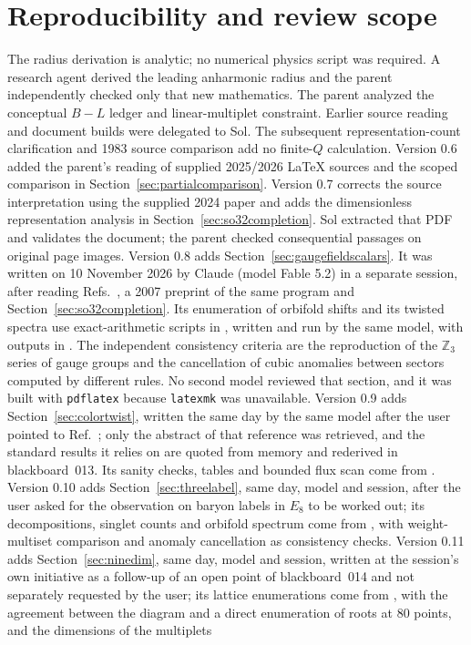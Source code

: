 \documentclass[11pt]{article}
\begin{document}









\section*{Reproducibility and review scope}
The radius derivation is analytic; no numerical physics script was required. A research agent derived the leading anharmonic radius and the parent independently checked only that new mathematics. The parent analyzed the conceptual $B-L$ ledger and linear-multiplet constraint. Earlier source reading and document builds were delegated to Sol. The subsequent representation-count clarification and 1983 source comparison add no finite-$Q$ calculation. Version 0.6 added the parent's reading of supplied 2025/2026 LaTeX sources and the scoped comparison in Section~\ref{sec:partialcomparison}. Version 0.7 corrects the source interpretation using the supplied 2024 paper and adds the dimensionless representation analysis in Section~\ref{sec:so32completion}. Sol extracted that PDF and validates the document; the parent checked consequential passages on original page images. Version 0.8 adds Section~\ref{sec:gaugefieldscalars}. It was written on 10 November 2026 by Claude (model Fable 5.2) in a separate session, after reading Refs.~\cite{Rivero2024,Rivero2005,Rivero2009}, a 2007 preprint of the same program and Section~\ref{sec:so32completion}. Its enumeration of orbifold shifts and its twisted spectra use exact-arithmetic scripts in , written and run by the same model, with outputs in . The independent consistency criteria are the reproduction of the $\mathbb Z_3$ series of gauge groups and the cancellation of cubic anomalies between sectors computed by different rules. No second model reviewed that section, and it was built with \texttt{pdflatex} because \texttt{latexmk} was unavailable. Version 0.9 adds Section~\ref{sec:colortwist}, written the same day by the same model after the user pointed to Ref.~\cite{CDS}; only the abstract of that reference was retrieved, and the standard results it relies on are quoted from memory and rederived in blackboard~013. Its sanity checks, tables and bounded flux scan come from . Version 0.10 adds Section~\ref{sec:threelabel}, same day, model and session, after the user asked for the observation on baryon labels in $E_8$ to be worked out; its decompositions, singlet counts and orbifold spectrum come from , with weight-multiset comparison and anomaly cancellation as consistency checks. Version 0.11 adds Section~\ref{sec:ninedim}, same day, model and session, written at the session's own initiative as a follow-up of an open point of blackboard~014 and not separately requested by the user; its lattice enumerations come from , with the agreement between the diagram and a direct enumeration of roots at 80 points, and the dimensions of the multiplets 
\end{document}
